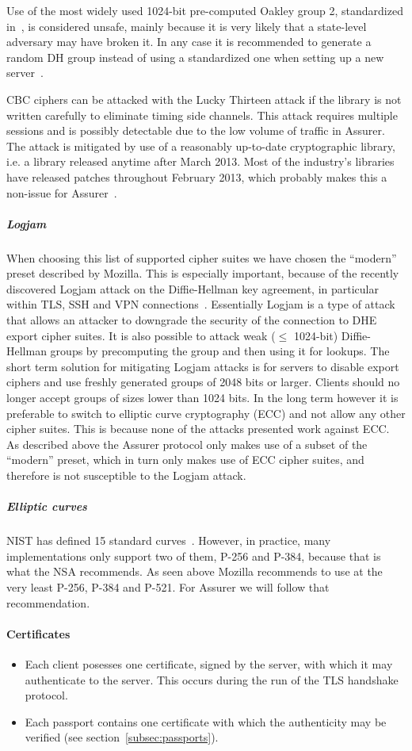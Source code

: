 Use of the most widely used 1024-bit pre-computed Oakley group 2, standardized in~\cite{ike}, is considered unsafe, mainly because it is very likely that a state-level adversary may have broken it. In any case it is recommended to generate a random DH group instead of using a standardized one when setting up a new server~\cite{logjam}.

CBC ciphers can be attacked with the Lucky Thirteen attack if the library is not written carefully to eliminate timing side channels. This attack requires multiple sessions and is possibly detectable due to the low volume of traffic in Assurer. The attack is mitigated by use of a reasonably up-to-date cryptographic library, i.e. a library released anytime after March 2013. Most of the industry's libraries have released patches throughout February 2013, which probably makes this a non-issue for Assurer~\cite{lucky13}.

\subparagraph{Logjam}
When choosing this list of supported cipher suites we have chosen the ``modern'' preset described by Mozilla. This is especially important, because of the recently discovered Logjam attack on the Diffie-Hellman key agreement, in particular within TLS, SSH and VPN connections~\cite{logjam}. Essentially Logjam is a type of attack that allows an attacker to downgrade the security of the connection to DHE export cipher suites. It is also possible to attack weak ($\leq$ 1024-bit) Diffie-Hellman groups by precomputing the group and then using it for lookups. The short term solution for mitigating Logjam attacks is for servers to disable export ciphers and use freshly generated groups of 2048 bits or larger. Clients should no longer accept groups of sizes lower than 1024 bits. In the long term however it is preferable to switch to elliptic curve cryptography (ECC) and not allow any other cipher suites. This is because none of the attacks presented work against ECC. As described above the Assurer protocol only makes use of a subset of the ``modern'' preset, which in turn only makes use of ECC cipher suites, and therefore is not susceptible to the Logjam attack.

\subparagraph{Elliptic curves}
NIST has defined 15 standard curves~\cite{dss}. However, in practice, many implementations only support two of them, P-256 and P-384, because that is what the NSA recommends. As seen above Mozilla recommends to use at the very least P-256, P-384 and P-521. For Assurer we will follow that recommendation.

\paragraph{Certificates}
\begin{itemize}
	\item Each client posesses one certificate, signed by the server, with which it may authenticate to the server. This occurs during the run of the TLS handshake protocol.
  \item Each passport contains one certificate with which the authenticity may be verified (see section~\ref{subsec:passports}).
\end{itemize}

